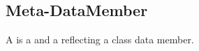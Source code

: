 \subsection{Meta-DataMember}
\label{concept-Meta-DataMember}

A  is a  and a 
reflecting a class data member.


